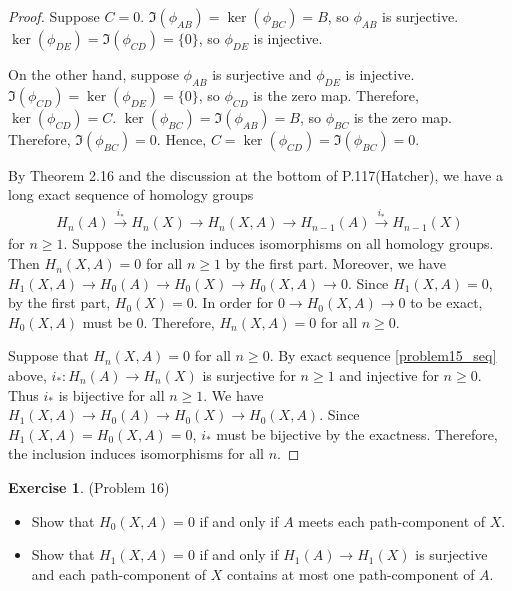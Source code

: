 \documentclass[12pt, psamsfonts]{amsart}
\theoremstyle{definition}
\newtheorem*{exer}{Exercise}
\theoremstyle{remark}
\numberwithin{equation}{section}
\begin{document}
\begin{proof}
  Suppose $C = 0$.
  $\Im(\phi_{AB}) = \ker(\phi_{BC}) = B$, so $\phi_{AB}$ is surjective.
  $\ker(\phi_{DE}) = \Im(\phi_{CD}) = \{ 0 \}$, so $\phi_{DE}$ is injective.

  On the other hand, suppose $\phi_{AB}$ is surjective and $\phi_{DE}$ is injective.
  $\Im(\phi_{CD}) = \ker(\phi_{DE}) = \{ 0 \}$, so $\phi_{CD}$ is the zero map.
  Therefore, $\ker(\phi_{CD}) = C$.
  $\ker(\phi_{BC}) = \Im(\phi_{AB}) = B$, so $\phi_{BC}$ is the zero map.
  Therefore, $\Im(\phi_{BC}) = 0$.
  Hence, $C = \ker(\phi_{CD}) = \Im(\phi_{BC}) = 0$.

  By Theorem 2.16 and the discussion at the bottom of P.117(Hatcher), we have a long exact sequence of homology groups
  \begin{align} \label{problem15_seq}
    H_n(A) \xrightarrow{i_*} H_n(X) \rightarrow H_n(X, A) \rightarrow H_{n - 1}(A) \xrightarrow{i_*} H_{n - 1}(X)
  \end{align}
  for $n \geq 1$.
  Suppose the inclusion induces isomorphisms on all homology groups.
  Then $H_n(X, A) = 0$ for all $n \geq 1$ by the first part.
  Moreover, we have $H_1(X, A) \rightarrow H_0(A) \rightarrow H_0(X) \rightarrow H_0(X, A) \rightarrow 0$.
  Since $H_1(X, A) = 0$, by the first part, $H_0(X) = 0$.
  In order for $0 \rightarrow H_0(X, A) \rightarrow 0$ to be exact, $H_0(X, A)$ must be 0.
  Therefore, $H_n(X, A) = 0$ for all $n \geq 0$.

  Suppose that $H_n(X, A) = 0$ for all $n \geq 0$.
  By exact sequence \ref{problem15_seq} above, $i_*: H_n(A) \rightarrow H_n(X)$ is surjective for $n \geq 1$ and injective for $n \geq 0$.
  Thus $i_*$ is bijective for all $n \geq 1$.
  We have $H_1(X, A) \rightarrow H_0(A) \rightarrow H_0(X) \rightarrow H_0(X, A)$.
  Since $H_1(X, A) = H_0(X, A) = 0$, $i_*$ must be bijective by the exactness.
  Therefore, the inclusion induces isomorphisms for all $n$.
\end{proof}

\begin{exer}{(Problem 16)}
  \begin{itemize}
    \item
      Show that $H_0(X, A) = 0$ if and only if $A$ meets each path-component of $X$.
    \item
      Show that $H_1(X, A) = 0$ if and only if $H_1(A) \rightarrow H_1(X)$ is surjective and each path-component of $X$ contains at most one path-component of $A$.
  \end{itemize}
\end{exer}
\end{document}
